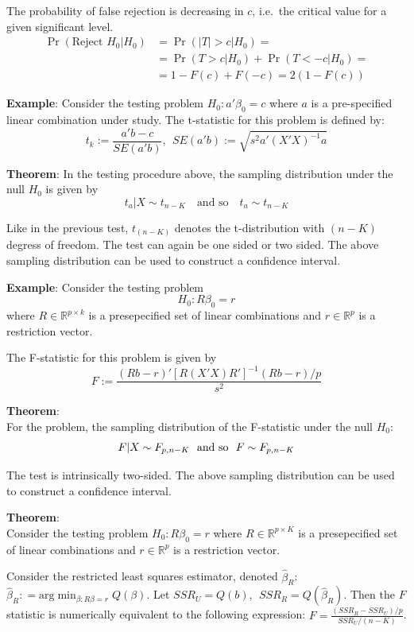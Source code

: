 \documentclass[12pt,]{book}
\begin{document}
The probability of false rejection is decreasing in \(c\), i.e.~the critical value for a given significant level.
\[
\begin{aligned}
    \Pr (\text{Reject } H_0 | H_0)  & = \Pr (|T|> c | H_0 ) = \\
    & = \Pr (T > c | H_0 ) +     \Pr (T < -c | H_0 ) = \\
    & = 1 - F(c) + F(-c) = 2(1-F(c))
\end{aligned}
\]

\textbf{Example}:
Consider the testing problem \(H_0: a'\beta_0=c\) where \(a\) is a pre-specified linear combination under study. The t-statistic for this problem is defined by:
\[
  t_k:= \frac{a'b - c}{SE(a'b)}, \ \ SE(a'b):= \sqrt{s^2 a'(X'X)^{-1}a}
\]

\textbf{Theorem}:
In the testing procedure above, the sampling distribution under the null \(H_0\) is given by
\[
    t_a|X \sim t _ {n-K} \quad\text{and so} \quad t_a \sim t _ {n-K} 
\]

Like in the previous test, \(t _ {(n-K)}\) denotes the t-distribution with \((n-K)\) degress of freedom. The test can again be one sided or two sided. The above sampling distribution can be used to construct a confidence interval.

\textbf{Example}:
Consider the testing problem
\[
    H_0: R \beta_0 = r
\]
where \(R \in \mathbb R^{p \times k}\) is a presepecified set of linear combinations and \(r \in \mathbb R^p\) is a restriction vector.

The F-statistic for this problem is given by
\[
    F:= \frac{(Rb-r)'[R(X'X)R']^{-1}(Rb-r)/p }{s^2}
\]

\textbf{Theorem}:\\
For the problem, the sampling distribution of the F-statistic under the null \(H_0:\)
\[
    F|X \sim F _ {p,n-K} \ \ \text{and so} \ \ F \sim F _ {p,n-K} \\
\]

The test is intrinsically two-sided. The above sampling distribution can be used to construct a confidence interval.

\textbf{Theorem}:\\
Consider the testing problem \(H_0: R \beta_0 = r\) where \(R \in \mathbb R^{p\times K}\) is a presepecified set of linear combinations and \(r \in \mathbb R^p\) is a restriction vector.

Consider the restricted least squares estimator, denoted \(\hat \beta_R\): \(\hat \beta_R: = \text{arg} \min _ { \beta: R \beta = r } Q( \beta)\). Let \(SSR_U = Q(b), \ \ SSR_R=Q(\hat \beta_R)\). Then the \(F\) statistic is numerically equivalent to the following expression: \(F = \frac{(SSR_R - SSR_U)/p}{SSR_U/(n-K)}\).
\end{document}
